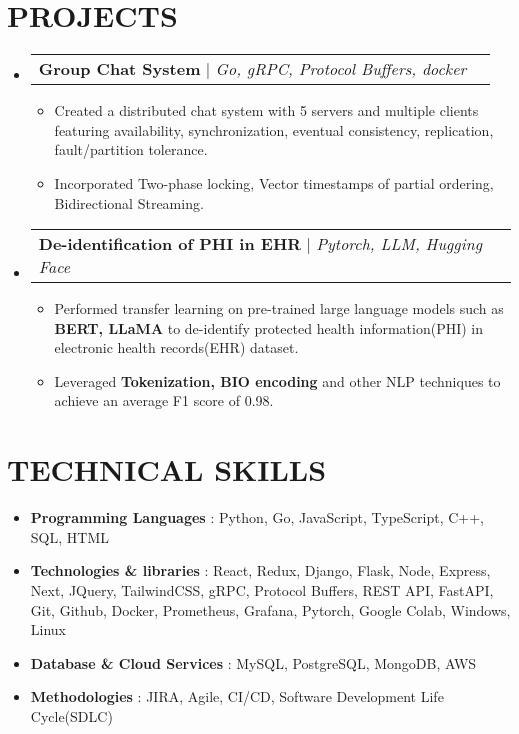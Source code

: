 \documentclass[letterpaper,10.9pt]{article}
\makeatletter
\newcommand{\resumeItem}[1]{
  \item\small{
    {#1 \vspace{-2pt}}
  }
}
\newcommand{\resumeskill}[2]{
\item 
      \textbf{ \small #1} \small : {\small #2}  \vspace{-5pt}\\
}
\newcommand{\resumeProjectHeading}[3]{
    \vspace{-2pt}\item
    \begin{tabular*}{1\textwidth}{l@{\extracolsep{\fill}}r}
      {\small #1}  {\small #2} | {\small #3}\\
    \end{tabular*}\vspace{-5pt}
}
\newcommand{\resumeSubHeadingListStart}{\begin{itemize}[leftmargin=0.0in, label={}]}
\newcommand{\resumeSubHeadingListEnd}{\end{itemize}}
\newcommand{\resumeItemListStart}{\begin{itemize}}
\newcommand{\resumeItemListEnd}{\end{itemize}\vspace{-7pt}}
\makeatother
\begin{document}
\section{PROJECTS}
    \resumeSubHeadingListStart
            \resumeProjectHeading
             {\textbf{Group Chat System}}{\href{https://github.com/CS2510-Distributed-Systems/Advanced-Group-Chat-System}{\faGithub}}{\emph{Go, gRPC, Protocol Buffers, docker}}
                \resumeItemListStart
                        \resumeItem{Created a distributed chat system with 5 servers and multiple clients featuring availability, synchronization, eventual consistency, replication, fault/partition tolerance.}
                        \resumeItem{Incorporated Two-phase locking, Vector timestamps of partial ordering, Bidirectional Streaming.}
              		\resumeItemListEnd
            \resumeProjectHeading
             {\textbf{De-identification of PHI in EHR}}{\href{https://github.com/dilipteja1/de-identification-of-PHI-in-Electronics-Health-Records.-/tree/main}{\faGithub}}{\emph{Pytorch, LLM, Hugging Face}}
          		    \resumeItemListStart
                            \resumeItem{Performed transfer learning on pre-trained large language models such as \textbf{BERT, LLaMA} to de-identify protected health information(PHI) in electronic health records(EHR) dataset.}
                            \resumeItem{Leveraged \textbf{Tokenization, BIO encoding} and other NLP techniques to achieve an average F1 score of 0.98.}
                        \resumeItemListEnd
            
    \resumeSubHeadingListEnd

\section{TECHNICAL SKILLS}
    \resumeSubHeadingListStart
        \resumeskill{Programming Languages}{Python, Go, JavaScript, TypeScript, C++, SQL, HTML}
        \resumeskill{Technologies \& libraries}{React, Redux, Django, Flask, Node, Express, Next, JQuery, TailwindCSS, gRPC,  Protocol Buffers, REST API, FastAPI,  Git, Github, Docker, Prometheus, Grafana, Pytorch, Google Colab, Windows, Linux }
        \resumeskill{Database \& Cloud Services}{MySQL, PostgreSQL, MongoDB, AWS}
        \resumeskill{Methodologies}{JIRA, Agile, CI/CD, Software Development Life Cycle(SDLC)}
    \resumeSubHeadingListEnd
    
\end{document}
